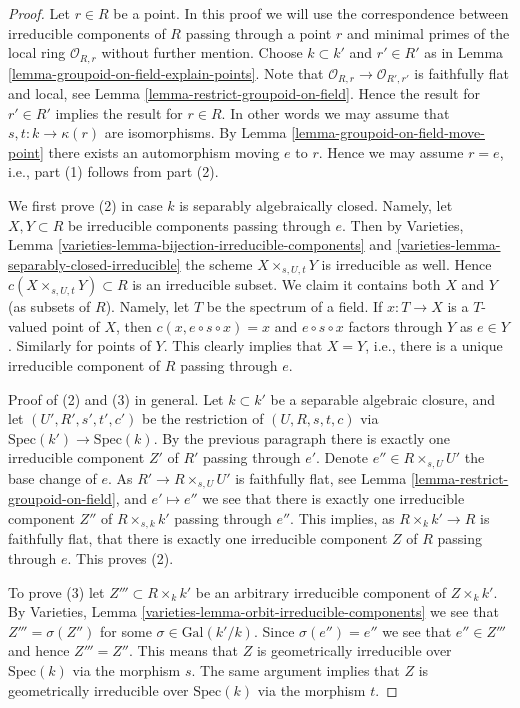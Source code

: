\begin{proof}
Let $r \in R$ be a point.
In this proof we will use the correspondence between irreducible components
of $R$ passing through a point $r$ and minimal primes of the local
ring $\mathcal{O}_{R, r}$ without further mention.
Choose $k \subset k'$ and $r' \in R'$ as in
Lemma \ref{lemma-groupoid-on-field-explain-points}.
Note that $\mathcal{O}_{R, r} \to \mathcal{O}_{R', r'}$
is faithfully flat and local, see
Lemma \ref{lemma-restrict-groupoid-on-field}.
Hence the result for $r' \in R'$ implies the result for $r \in R$.
In other words we may assume that $s, t : k \to \kappa(r)$
are isomorphisms. By
Lemma \ref{lemma-groupoid-on-field-move-point}
there exists an automorphism moving $e$ to $r$.
Hence we may assume $r = e$, i.e., part (1) follows from part (2).

\medskip\noindent
We first prove (2) in case $k$ is separably algebraically closed.
Namely, let $X, Y \subset R$ be irreducible components
passing through $e$. Then by
Varieties, Lemma \ref{varieties-lemma-bijection-irreducible-components} and
\ref{varieties-lemma-separably-closed-irreducible}
the scheme $X \times_{s, U, t} Y$ is irreducible as well.
Hence $c(X \times_{s, U, t} Y) \subset R$ is an irreducible subset.
We claim it contains both $X$ and $Y$ (as subsets of $R$).
Namely, let $T$ be the spectrum of a field. If $x : T \to X$ is a $T$-valued
point of $X$, then $c(x, e \circ s \circ x) = x$ and $e \circ s \circ x$
factors through $Y$ as $e \in Y$. Similarly for points of $Y$.
This clearly implies that $X = Y$, i.e., there is a unique irreducible
component of $R$ passing through $e$.

\medskip\noindent
Proof of (2) and (3) in general.
Let $k \subset k'$ be a separable algebraic closure, and
let $(U', R', s', t', c')$ be the restriction of
$(U, R, s, t, c)$ via $\text{Spec}(k') \to \text{Spec}(k)$.
By the previous paragraph there is exactly one irreducible
component $Z'$ of $R'$ passing through $e'$.
Denote $e'' \in R \times_{s, U} U'$ the base change of $e$.
As $R' \to R \times_{s, U} U'$ is faithfully flat, see
Lemma \ref{lemma-restrict-groupoid-on-field},
and $e' \mapsto e''$ we see that there is exactly one
irreducible component $Z''$ of $R \times_{s, k} k'$ passing
through $e''$. This implies, as $R \times_k k' \to R$ is faithfully
flat, that there is exactly one irreducible component $Z$ of $R$
passing through $e$. This proves (2).

\medskip\noindent
To prove (3) let $Z''' \subset R \times_k k'$ be an arbitrary
irreducible component of $Z \times_k k'$. By
Varieties, Lemma \ref{varieties-lemma-orbit-irreducible-components}
we see that $Z''' = \sigma(Z'')$ for some $\sigma \in \text{Gal}(k'/k)$.
Since $\sigma(e'') = e''$ we see that $e'' \in Z'''$ and hence
$Z''' = Z''$. This means that $Z$ is geometrically irreducible
over $\text{Spec}(k)$ via the morphism $s$.
The same argument implies that $Z$ is geometrically irreducible
over $\text{Spec}(k)$ via the morphism $t$.
\end{proof}

